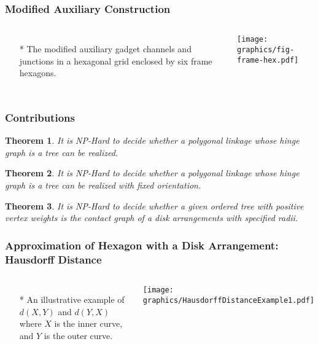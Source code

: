 \documentclass{beamer}
\newtheorem{thm}{Theorem}
\begin{document}
\begin{frame} \frametitle{Modified Auxiliary Construction}
    \begin{columns}[c]
        \begin{itemize}
            \item[*] The modified auxiliary gadget channels and junctions in a hexagonal grid enclosed by six frame hexagons.
        \end{itemize}
        \begin{minipage}{\linewidth}
            \begin{center}
            \texttt{[image: graphics/fig-frame-hex.pdf]}\label{gfx:fig-frame-hex.pdf}
            \end{center}
        \end{minipage}
    \end{columns}
\end{frame}
\begin{frame}\frametitle{Contributions}
     \begin{thm}
     It is NP-Hard to decide whether a polygonal linkage whose hinge graph is a \textit{tree} can be realized.
     \end{thm}
    \begin{thm} It is NP-Hard to decide whether a polygonal linkage whose hinge graph is a \textit{tree} can be realized with fixed orientation.
    \end{thm}
    \begin{thm} It is NP-Hard to decide whether a given ordered tree with positive vertex weights is the contact graph of a disk arrangements with specified radii.
    \end{thm}
\end{frame}
\begin{frame} \frametitle{Approximation of Hexagon with a Disk Arrangement: Hausdorff Distance}
    \begin{columns}[c]
            \begin{itemize}
            \item[*] An illustrative example of $d(X,Y)$ and $d(Y,X)$ where $X$ is the inner curve, and $Y$ is the outer curve.
            \end{itemize}  
        \begin{minipage}{\linewidth}
        \begin{center}
        \texttt{[image: graphics/HausdorffDistanceExample1.pdf]}
        \end{center}
        \end{minipage}
    \end{columns}
\end{frame}
\end{document}
